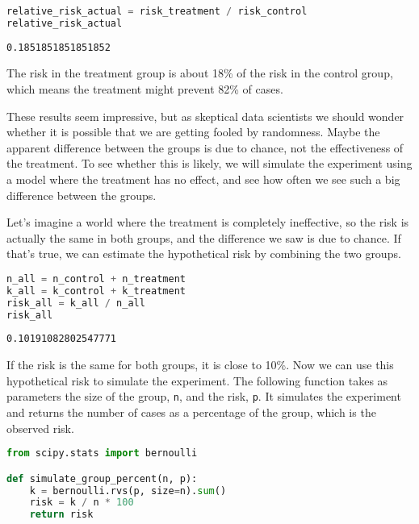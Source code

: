 \begin{lstlisting}[language=Python,style=source]
relative_risk_actual = risk_treatment / risk_control
relative_risk_actual
\end{lstlisting}

\begin{lstlisting}[style=output]
0.1851851851851852
\end{lstlisting}

The risk in the treatment group is about 18\% of the risk in the control
group, which means the treatment might prevent 82\% of cases.

These results seem impressive, but as skeptical data scientists we
should wonder whether it is possible that we are getting fooled by
randomness. Maybe the apparent difference between the groups is due to
chance, not the effectiveness of the treatment. To see whether this is
likely, we will simulate the experiment using a model where the
treatment has no effect, and see how often we see such a big difference
between the groups.

Let's imagine a world where the treatment is completely ineffective, so
the risk is actually the same in both groups, and the difference we saw
is due to chance. If that's true, we can estimate the hypothetical risk
by combining the two groups.

\begin{lstlisting}[language=Python,style=source]
n_all = n_control + n_treatment
k_all = k_control + k_treatment
risk_all = k_all / n_all
risk_all
\end{lstlisting}

\begin{lstlisting}[style=output]
0.10191082802547771
\end{lstlisting}

If the risk is the same for both groups, it is close to 10\%. Now we can
use this hypothetical risk to simulate the experiment. The following
function takes as parameters the size of the group,
\passthrough{\lstinline!n!}, and the risk, \passthrough{\lstinline!p!}.
It simulates the experiment and returns the number of cases as a
percentage of the group, which is the observed risk.

\begin{lstlisting}[language=Python,style=source]
from scipy.stats import bernoulli

def simulate_group_percent(n, p):
    k = bernoulli.rvs(p, size=n).sum()
    risk = k / n * 100
    return risk
\end{lstlisting}

